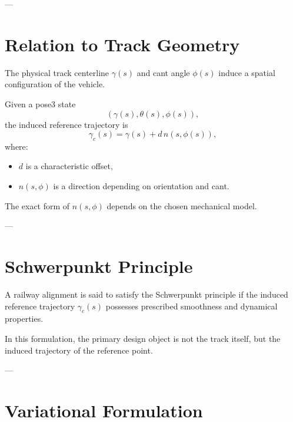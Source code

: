 ---

\section{Relation to Track Geometry}

\begin{remark}
The physical track centerline \(\gamma(s)\) and cant angle \(\phi(s)\)
induce a spatial configuration of the vehicle.
\end{remark}

\begin{definition}
Given a pose3 state
\[
(\gamma(s),\theta(s),\phi(s)),
\]
the induced reference trajectory is
\[
\gamma_c(s)
=
\gamma(s)
+
d\, n(s,\phi(s)),
\]
where:
\begin{itemize}
\item \(d\) is a characteristic offset,
\item \(n(s,\phi)\) is a direction depending on orientation and cant.
\end{itemize}
\end{definition}

\begin{remark}
The exact form of \(n(s,\phi)\) depends on the chosen mechanical model.
\end{remark}


---

\section{Schwerpunkt Principle}

\begin{definition}
A railway alignment is said to satisfy the Schwerpunkt principle if the
induced reference trajectory \(\gamma_c(s)\) possesses prescribed
smoothness and dynamical properties.
\end{definition}

\begin{remark}
In this formulation, the primary design object is not the track itself,
but the induced trajectory of the reference point.
\end{remark}

---

\section{Variational Formulation}

